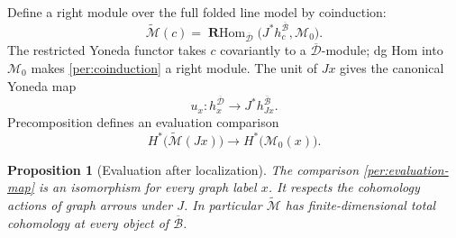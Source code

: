 \documentclass[11pt]{article}
\newtheorem{proposition}[theorem]{Proposition}
\theoremstyle{definition}
\theoremstyle{remark}
\DeclareMathOperator{\RHom}{\mathbf R Hom}
\numberwithin{equation}{section}
\begin{document}
Define a right module over the full folded line model by coinduction:
\begin{equation}
 \widetilde{\mathcal M}(c)
   =\RHom_{\overline{\mathcal D}}
       \bigl(J^*h_c^{\overline{\mathcal B}},\mathcal M_0\bigr).
 \label{per:coinduction}
\end{equation}
The restricted Yoneda functor takes $c$ covariantly to a
$\overline{\mathcal D}$-module; dg Hom into $\mathcal M_0$ makes
\eqref{per:coinduction} a right module.  The unit of $Jx$ gives the
canonical Yoneda map
\[
 u_x:h_x^{\overline{\mathcal D}}\longrightarrow
                  J^*h_{Jx}^{\overline{\mathcal B}}.
\]
Precomposition defines an evaluation comparison
\begin{equation}
 H^*\bigl(\widetilde{\mathcal M}(Jx)\bigr)
       \longrightarrow H^*\bigl(\mathcal M_0(x)\bigr).
 \label{per:evaluation-map}
\end{equation}

\begin{proposition}[Evaluation after localization]
\label{per:localization}
The comparison \eqref{per:evaluation-map} is an isomorphism for every
graph label $x$.  It respects the cohomology actions of graph arrows
under $J$.  In particular $\widetilde{\mathcal M}$ has finite-dimensional
total cohomology at every object of $\overline{\mathcal B}$.
\end{proposition}
\end{document}
